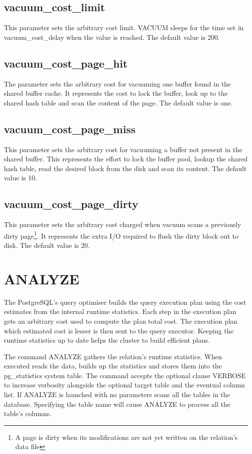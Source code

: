 \subsection{vacuum\_cost\_limit}
This parameter sets the arbitrary cost limit. VACUUM sleeps for the time set in vacuum\_cost\_delay when 
the value is reached. The default value is 200. 

\subsection{vacuum\_cost\_page\_hit}
The parameter sets the arbitrary cost for vacuuming one buffer found in the shared buffer cache. It 
represents the cost to lock the buffer, look up to the shared hash table and scan the content of the page. 
The default value is one.

\subsection{vacuum\_cost\_page\_miss}
This parameter sets the arbitrary cost for vacuuming a buffer not present in the shared buffer. This 
represents the effort to lock the buffer pool, lookup the shared hash table, read the desired block 
from the disk and scan its content. The default value is 10.

\subsection{vacuum\_cost\_page\_dirty}
This parameter sets the arbitrary cost charged when vacuum scans a previously dirty page\footnote{A 
page is dirty when its modifications are not yet written on the relation's data file}. It represents the 
extra I/O required to flush the dirty block out to disk. The default value is 20.

\section{ANALYZE}
\label{sec:ANALYZE}
The PostgreSQL's query optimiser builds the query execution plan using the cost estimates from the 
internal runtime statistics. Each step in the execution plan gets an arbitrary cost used to compute the 
plan total cost. The execution plan which estimated cost is lesser is then sent to the query executor. 
Keeping the runtime statistics up to date helps the cluster to build efficient plans.\newline

The command ANALYZE gathers the relation's runtime statistics. When executed reads the 
data, builds up the statistics and stores them into the pg\_statistics system table. The command accepts the optional clause VERBOSE to increase verbosity alongside the 
optional target table and the eventual column list. If ANALYZE is launched with no parameters scans all the 
tables in the database. Specifying the table name will cause ANALYZE to process all the table's 
columns.\newline

